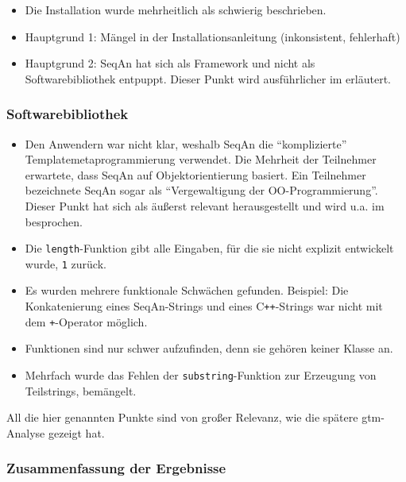 \begin{itemize}
  \item Die Installation wurde mehrheitlich als schwierig beschrieben.
  \item Hauptgrund 1: Mängel in der Installationsanleitung (inkonsistent, fehlerhaft)
  \item Hauptgrund 2: SeqAn hat sich als Framework und nicht als Softwarebibliothek entpuppt. Dieser Punkt wird ausführlicher im  erläutert.
\end{itemize}



\subsubsection{Softwarebibliothek}

\begin{itemize}
  \item Den Anwendern war nicht klar, weshalb SeqAn die ``komplizierte'' Templatemetaprogrammierung verwendet. Die Mehrheit der Teilnehmer erwartete, dass SeqAn auf Objektorientierung basiert. Ein Teilnehmer bezeichnete SeqAn sogar als ``Vergewaltigung der OO-Programmierung''. Dieser Punkt hat sich als äußerst relevant herausgestellt und wird u.a. im  besprochen.
  \item Die \texttt{length}-Funktion gibt alle Eingaben, für die sie nicht explizit entwickelt wurde, \texttt{1} zurück.
  \item Es wurden mehrere funktionale Schwächen gefunden. Beispiel: Die Konkatenierung eines SeqAn-Strings und eines C{}\verb!++!-Strings war nicht mit dem \texttt{+}-Operator möglich.
  \item Funktionen sind nur schwer aufzufinden, denn sie gehören keiner Klasse an.
  \item Mehrfach wurde das Fehlen der \texttt{substring}-Funktion zur Erzeugung von Teilstrings, bemängelt.
\end{itemize}

All die hier genannten Punkte sind von großer Relevanz, wie die spätere \gls{gtm}-Analyse gezeigt hat.



\subsubsection{Zusammenfassung der Ergebnisse}

